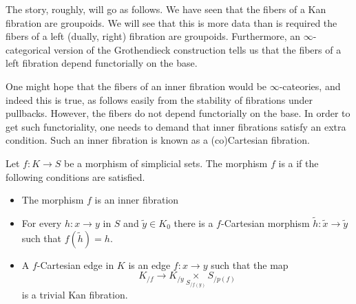 \documentclass[main.tex]{subfiles}
\begin{document}
The story, roughly, will go as follows. We have seen that the fibers of a Kan fibration are groupoids. We will see that this is more data than is required the fibers of a left (dually, right) fibration are groupoids. Furthermore, an $\infty$-categorical version of the Grothendieck construction tells us that the fibers of a left fibration depend functorially on the base.

One might hope that the fibers of an inner fibration would be $\infty$-cateories, and indeed this is true, as follows easily from the stability of fibrations under pullbacks. However, the fibers do not depend functorially on the base. In order to get such functoriality, one needs to demand that inner fibrations satisfy an extra condition. Such an inner fibration is known as a (co)Cartesian fibration.

\begin{definition}
  \label{def:cartesian_fibration}
  Let $f\colon K \to S$ be a morphism of simplicial sets. The morphism $f$ is a  if the following conditions are satisfied.
  \begin{itemize}
    \item The morphism $f$ is an inner fibration

    \item For every $h\colon x \to y$ in $S$ and $\tilde{y} \in K_{0}$ there is a $f$-Cartesian morphism $\tilde{h}\colon \tilde{x} \to \tilde{y}$ such that $f(\tilde{h}) = h$.

    \item A $f$-Cartesian edge in $K$ is an edge $f\colon x \to y$ such that the map
      \begin{equation*}
        K_{/f} \to K_{/y} \underset{S_{/f(y)}}{\times} S_{/p(f)}
      \end{equation*}
      is a trivial Kan fibration.
  \end{itemize}
\end{definition}
\end{document}
